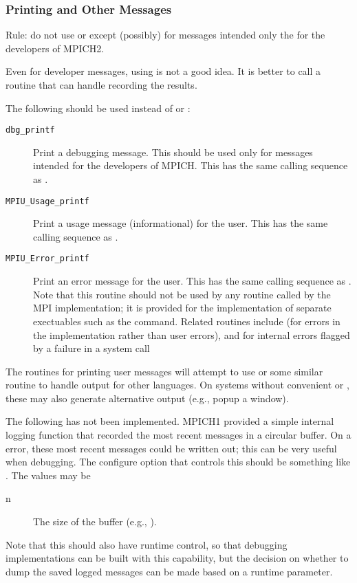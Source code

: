 \documentclass{article}
\begin{document}
\subsubsection{Printing and Other Messages}
Rule: do not use  or  except (possibly) for
messages intended only the for the developers of MPICH2.

Even for developer messages, using  is not a good idea.
It is better to call a routine that can handle recording the results.

The following should be used instead of  or :
\begin{description}
\item[\texttt{dbg_printf}]Print a debugging message.  This should be
  used only for messages intended for the developers of MPICH.  This
  has the same calling sequence as .
\item[\texttt{MPIU_Usage_printf}]Print a usage message (informational) for
  the user.  This has the same calling sequence as .
\item[\texttt{MPIU_Error_printf}]Print an error message for the user.  This
  has the same calling sequence as .  Note that this
  routine should not be used by any routine called by the MPI
  implementation; it is provided for the implementation of separate
  exectuables such as the  command.  Related routines
  include  (for errors in the
  implementation rather than user errors), and
   for internal errors flagged by
  a failure in a system call
\end{description}
The routines for printing user messages will attempt to use
 or some similar routine to handle output for other
languages.  On systems without convenient  or
, these may also generate alternative output (e.g., popup
a window).



The following has not been implemented.
MPICH1 provided a simple internal logging function that recorded the
most recent messages in a circular buffer.  On a error, these most
recent messages could be written out; this can be very useful when debugging.
The configure option that controls this should be something like
.  The values may be
\begin{description}
\item[n]The size of the buffer (e.g., ).
\end{description}
Note that this should also have runtime control, so that debugging
implementations can be built with this capability, but the decision on
whether to dump the saved logged messages can be made based on a
runtime parameter.
\end{document}
